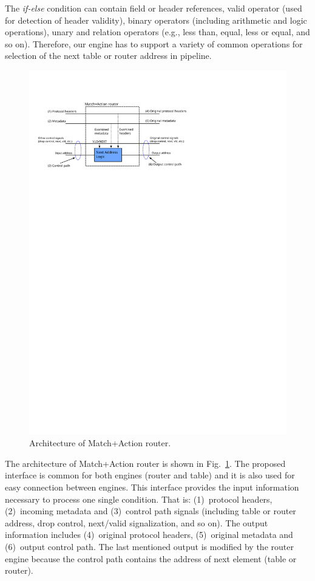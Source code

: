 The \textit{if-else} condition can contain field or header references, valid operator (used for detection of header validity), binary operators
(including arithmetic and logic operations), unary and relation operators (e.g., less than, equal, less or equal, and so on).  
Therefore, our engine has to support a variety of common operations for selection of the next table or router address in pipeline. 

\begin{figure}[ht]
    \centering
    \includegraphics[scale=0.9]{chapters/pic/match-action-router-architecture}
    \caption{Architecture of Match+Action router.}
    \label{fig:architectureMatchActionRouter}
\end{figure}

The architecture of Match+Action router is shown in Fig.~\ref{fig:architectureMatchActionRouter}. 
The proposed interface is common for both engines (router and table) and it is also used for easy connection between engines. 
This interface provides the input information necessary to process one single condition. That is: (1)~protocol headers, 
(2)~incoming metadata and (3)~control path signals (including table or router address, drop control, next/valid signalization, and so on). 
The output information includes (4)~original protocol headers, (5)~original metadata and (6)~output control path. The last mentioned 
output is modified by the router engine because the control path contains the address of next element (table or router).

